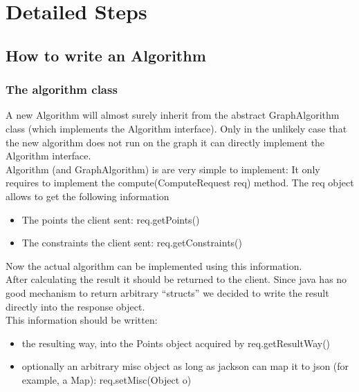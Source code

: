 \documentclass[ngerman,titlepage,parskip=true]{scrartcl}
\begin{document}
\section{Detailed Steps}

  \subsection{How to write an Algorithm}

    \subsubsection{The algorithm class}
		A new Algorithm will almost surely inherit from the abstract GraphAlgorithm class (which implements the Algorithm interface). Only in the unlikely case that the new algorithm does not run on the graph it can directly implement the Algorithm interface.\\
		Algorithm (and GraphAlgorithm) is are very simple to implement: It only requires to implement the compute(ComputeRequest req) method.
		The req object allows to get the following information
		\begin{itemize}
		  \item The points the client sent: req.getPoints()
		  \item The constraints the client sent: req.getConstraints()
		\end{itemize}
		Now the actual algorithm can be implemented using this information.\\
		After calculating the result it should be returned to the client. Since java has no good mechanism to return arbitrary ``structs'' we decided to write the result directly into the response object.\\
		This information should be written:
		\begin{itemize}
		  \item the resulting way, into the Points object acquired by req.getResultWay()
		  \item optionally an arbitrary misc object as long as jackson can map it to json (for example, a Map): req.setMisc(Object o)
		\end{itemize}
\end{document}

